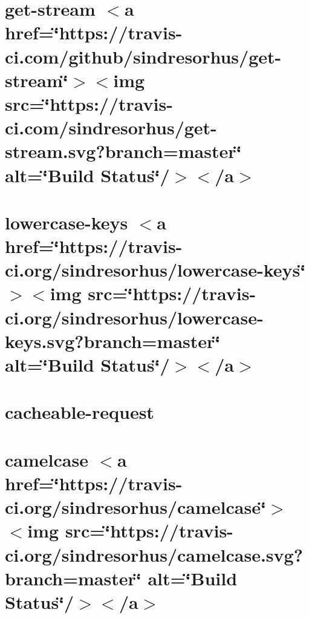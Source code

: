 \let\mypdfximage\pdfximage\def\pdfximage{\immediate\mypdfximage}\documentclass[twoside]{book}
\newcommand{\+}{\discretionary{\mbox{\scriptsize$\hookleftarrow$}}{}{}}
\begin{document}
\chapter{get-\/stream $<$a href=\char`\"{}https\+://travis-\/ci.\+com/github/sindresorhus/get-\/stream\char`\"{}$>$$<$img src=\char`\"{}https\+://travis-\/ci.\+com/sindresorhus/get-\/stream.\+svg?branch=master\char`\"{} alt=\char`\"{}\+Build Status\char`\"{}/$>$$<$/a$>$}
\label{md__c_1__git_hub__p_r_o_y_e_c_t_o-_i_i_i-_g_o_t_rest-api_node_modules_cacheable-request_node_modules_get-stream_readme}

\chapter{lowercase-\/keys $<$a href=\char`\"{}https\+://travis-\/ci.\+org/sindresorhus/lowercase-\/keys\char`\"{}$>$$<$img src=\char`\"{}https\+://travis-\/ci.\+org/sindresorhus/lowercase-\/keys.\+svg?branch=master\char`\"{} alt=\char`\"{}\+Build Status\char`\"{}/$>$$<$/a$>$}
\label{md__c_1__git_hub__p_r_o_y_e_c_t_o-_i_i_i-_g_o_t_rest-api_node_modules_cacheable-request_node_modules_lowercase-keys_readme}

\chapter{cacheable-\/request}
\label{md__c_1__git_hub__p_r_o_y_e_c_t_o-_i_i_i-_g_o_t_rest-api_node_modules_cacheable-request__r_e_a_d_m_e}

\chapter{camelcase $<$a href=\char`\"{}https\+://travis-\/ci.\+org/sindresorhus/camelcase\char`\"{}$>$$<$img src=\char`\"{}https\+://travis-\/ci.\+org/sindresorhus/camelcase.\+svg?branch=master\char`\"{} alt=\char`\"{}\+Build Status\char`\"{}/$>$$<$/a$>$}
\label{md__c_1__git_hub__p_r_o_y_e_c_t_o-_i_i_i-_g_o_t_rest-api_node_modules_camelcase_readme}

\end{document}
